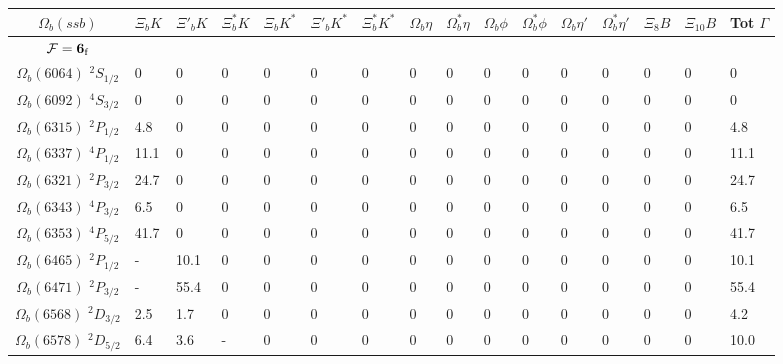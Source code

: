 \begin{tabular}{c |  p{0.58cm}  p{0.58cm}  p{0.58cm}  p{0.58cm}  p{0.58cm}  p{0.58cm}  p{0.58cm}  p{0.58cm}  p{0.58cm}  p{0.58cm}  p{0.58cm}  p{0.58cm}  p{0.58cm}  p{0.58cm}p{0.75cm}} \hline \hline
$\Omega_b(ssb)$  & $\Xi_{b} K$  & $\Xi'_{b} K$  & $\Xi^{*}_{b} K$  & $\Xi_{b} K^{*}$  & $\Xi'_{b}K^{*}$  & $\Xi^{*}_{b} K^{*}$  & $\Omega_{b} \eta$  & $\Omega^{*}_{b} \eta$  & $\Omega_{b} \phi$  & $\Omega^{*}_{b} \phi$  & $\Omega_{b} \eta'$  & $\Omega^{*}_{b} \eta'$  & $\Xi_{8} B$  & $\Xi_{10} B$  & Tot $\Gamma$  \\ \hline
$\mathcal{F}={\bf {6}}_{\rm f}$ &&&&&&&&&&&&&&\\ \hline
$\Omega_b(6064)$ $^{2}S_{1/2}$&$0$   &$0$   &$0$   &$0$   &$0$   &$0$   &$0$   &$0$   &$0$   &$0$   &$0$   &$0$   &$0$   &$0$   &$0$  \\
$\Omega_b(6092)$ $^{4}S_{3/2}$&$0$   &$0$   &$0$   &$0$   &$0$   &$0$   &$0$   &$0$   &$0$   &$0$   &$0$   &$0$   &$0$   &$0$   &$0$  \\
$\Omega_b(6315)$ $^{2}P_{1/2}$&4.8   &$0$   &$0$   &$0$   &$0$   &$0$   &$0$   &$0$   &$0$   &$0$   &$0$   &$0$   &$0$   &$0$   &4.8  \\
$\Omega_b(6337)$ $^{4}P_{1/2}$&11.1   &$0$   &$0$   &$0$   &$0$   &$0$   &$0$   &$0$   &$0$   &$0$   &$0$   &$0$   &$0$   &$0$   &11.1  \\
$\Omega_b(6321)$ $^{2}P_{3/2}$&24.7   &$0$   &$0$   &$0$   &$0$   &$0$   &$0$   &$0$   &$0$   &$0$   &$0$   &$0$   &$0$   &$0$   &24.7  \\
$\Omega_b(6343)$ $^{4}P_{3/2}$&6.5   &$0$   &$0$   &$0$   &$0$   &$0$   &$0$   &$0$   &$0$   &$0$   &$0$   &$0$   &$0$   &$0$   &6.5  \\
$\Omega_b(6353)$ $^{4}P_{5/2}$&41.7   &$0$   &$0$   &$0$   &$0$   &$0$   &$0$   &$0$   &$0$   &$0$   &$0$   &$0$   &$0$   &$0$   &41.7  \\
$\Omega_b(6465)$ $^{2}P_{1/2}$&-   &10.1   &$0$   &$0$   &$0$   &$0$   &$0$   &$0$   &$0$   &$0$   &$0$   &$0$   &$0$   &$0$   &10.1  \\
$\Omega_b(6471)$ $^{2}P_{3/2}$&-   &55.4   &$0$   &$0$   &$0$   &$0$   &$0$   &$0$   &$0$   &$0$   &$0$   &$0$   &$0$   &$0$   &55.4  \\
$\Omega_b(6568)$ $^{2}D_{3/2}$&2.5   &1.7   &$0$   &$0$   &$0$   &$0$   &$0$   &$0$   &$0$   &$0$   &$0$   &$0$   &$0$   &$0$   &4.2  \\
$\Omega_b(6578)$ $^{2}D_{5/2}$&6.4   &3.6   &-   &$0$   &$0$   &$0$   &$0$   &$0$   &$0$   &$0$   &$0$   &$0$   &$0$   &$0$   &10.0  \\

\end{tabular}
